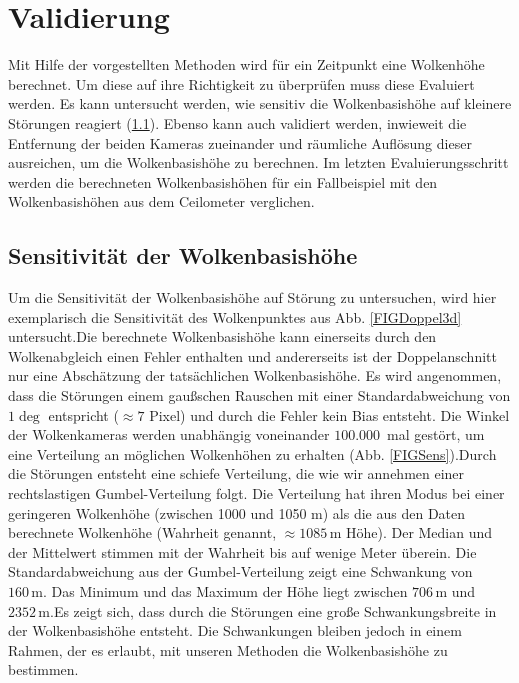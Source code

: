 \documentclass[a4paper,11pt,twoside,german]{article}
\newcommand{\absatz}{\smallbreak}
\begin{document}

\section{Validierung} \label{SECValidation} Mit Hilfe der vorgestellten Methoden
wird für ein Zeitpunkt eine Wolkenhöhe berechnet. Um diese auf ihre Richtigkeit
zu überprüfen muss diese Evaluiert werden. Es kann untersucht werden, wie
sensitiv die Wolkenbasishöhe auf kleinere Störungen reagiert (\ref{SECSens}).
Ebenso kann auch validiert werden, inwieweit die Entfernung der beiden Kameras
zueinander und räumliche Auflösung dieser ausreichen, um die Wolkenbasishöhe zu
berechnen. Im letzten Evaluierungsschritt werden die berechneten
Wolkenbasishöhen für ein Fallbeispiel mit den Wolkenbasishöhen aus dem
Ceilometer verglichen.

\subsection{Sensitivität der Wolkenbasishöhe} \label{SECSens} Um die
Sensitivität der Wolkenbasishöhe auf Störung zu untersuchen, wird hier
exemplarisch die Sensitivität des Wolkenpunktes aus Abb. \ref{FIGDoppel3d}
untersucht.\absatz Die berechnete Wolkenbasishöhe kann einerseits durch den
Wolkenabgleich einen Fehler enthalten und andererseits ist der Doppelanschnitt
nur eine Abschätzung der tatsächlichen Wolkenbasishöhe. Es wird angenommen, dass
die Störungen einem gaußschen Rauschen mit einer Standardabweichung von $1\deg$
entspricht ($\approx7$ Pixel) und durch die Fehler kein Bias entsteht. Die
Winkel der Wolkenkameras werden unabhängig voneinander $100.000$~mal gestört, um
eine Verteilung an möglichen Wolkenhöhen zu erhalten (Abb.
\ref{FIGSens}).\absatz Durch die Störungen entsteht eine schiefe Verteilung, die
wie wir annehmen einer rechtslastigen Gumbel-Verteilung folgt. Die Verteilung
hat ihren Modus bei einer geringeren Wolkenhöhe (zwischen 1000 und 1050 m) als
die aus den Daten berechnete Wolkenhöhe (Wahrheit genannt,
$\approx1085\,\mathrm{m}$ Höhe). Der Median und der Mittelwert stimmen mit der
Wahrheit bis auf wenige Meter überein.  Die Standardabweichung aus der
Gumbel-Verteilung zeigt eine Schwankung von $160\,\mathrm{m}$.  Das Minimum und
das Maximum der Höhe liegt zwischen $706\,\mathrm{m}$ und
$2352\,\mathrm{m}$.\absatz Es zeigt sich, dass durch die Störungen eine große
Schwankungsbreite in der Wolkenbasishöhe entsteht. Die Schwankungen bleiben
jedoch in einem Rahmen, der es erlaubt, mit unseren Methoden die Wolkenbasishöhe
zu bestimmen.  \clearpage
\end{document}
